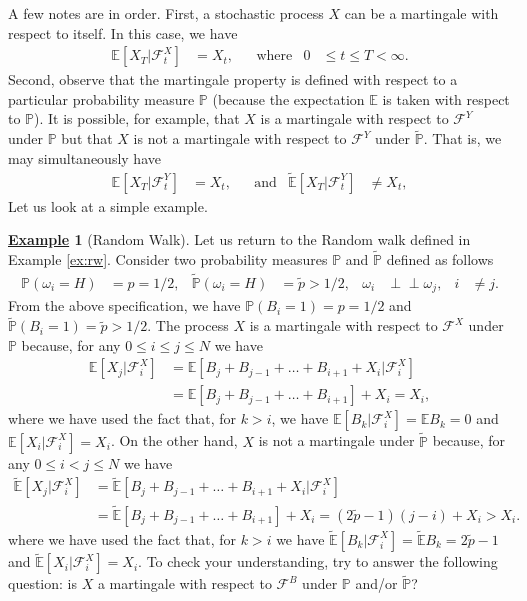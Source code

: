\documentclass[12pt]{book}
\numberwithin{equation}{chapter}
\theoremstyle{plain}
\numberwithin{theorem}{section}
\theoremstyle{definition}
\newtheorem{example}[theorem]{\underline{Example}}
\numberwithin{exercise}{chapter}
\newcommand{\<}{\langle}
\renewcommand{\>}{\rangle}
\renewcommand{\(}{\left(}
\renewcommand{\)}{\right)}
\renewcommand{\[}{\left[}
\renewcommand{\]}{\right]}
\newcommand\Eb{\mathds{E}}
\newcommand\Pb{\mathds{P}}
\newcommand\Fc{\mathscr{F}}
\newcommand\om{\omega}
\newcommand\Ebt{\widetilde{\Eb}}
\newcommand\Pbt{\widetilde{\Pb}}
\newcommand{\ind}{\perp \! \! \! \perp}
\theoremstyle{definition}
\numberwithin{question}{section}
\newcommand\pt{\widetilde{p}}
\begin{document}
\noindent
A few notes are in order.  First, a stochastic process $X$ can be a martingale with respect to itself.  In this case, we have
\begin{align}
\Eb[ X_T | \Fc_t^X ]
	&=	X_t , &
	&\text{where}&
0
	&\leq t \leq T < \infty .
\end{align}
Second, observe that the martingale property is defined with respect to a particular probability measure $\Pb$ (because the expectation $\Eb$ is taken with respect to $\Pb$).  It is possible, for example, that $X$ is a martingale with respect to $\Fc^Y$ under $\Pb$ but that $X$ is not a martingale with respect to $\Fc^Y$ under $\Pbt$.  That is, we may simultaneously have
\begin{align}
\Eb[ X_T | \Fc_t^Y ]
	&=	X_t , &
	&\text{and}&
\Ebt[ X_T | \Fc_t^Y ]
	&\neq	X_t ,
\end{align}
Let us look at a simple example.

\begin{example}[Random Walk]
Let us return to the Random walk defined in Example \ref{ex:rw}.
Consider two probability measures $\Pb$ and $\Pbt$ defined as follows
\begin{align}
\Pb(\om_i = H)
	&=	p = 1/2 , &
\Pbt( \om_i = H)
	&=	\pt > 1/2 , &
\om_i
	&\ind \om_j , &
i
	&\neq j .
\end{align}
From the above specification, we have $\Pb( B_i = 1 ) = p = 1/2$ and $\Pbt( B_i = 1 ) = \pt > 1/2$.
The process $X$ is a martingale with respect to $\Fc^X$ under $\Pb$ because, for any $0 \leq i \leq j \leq N$ we have
\begin{align}
\Eb[ X_j | \Fc_i^X ]
	&=	\Eb[ B_j + B_{j-1} + \ldots + B_{i+1} + X_i | \Fc_i^X ] \\
	&=		\Eb[ B_j + B_{j-1} + \ldots + B_{i+1} ] + X_i 
	=		 X_i  ,
\end{align}
where we have used the fact that, for $k>i$, we have $\Eb[ B_k | \Fc_i^X ] = \Eb B_k = 0$ and $\Eb[ X_i | \Fc_i^X ] = X_i$.
On the other hand, $X$ is not a martingale under $\Pbt$ because, for any $0 \leq i < j \leq N$ we have
\begin{align}
\Ebt[ X_j | \Fc_i^X ]
	&=	\Ebt[ B_j + B_{j-1} + \ldots + B_{i+1} + X_i | \Fc_i^X ] \\
	&=		\Ebt[ B_j + B_{j-1} + \ldots + B_{i+1} ] + X_i 
	=		(2 \pt - 1 ) (j - i) + X_i 
	>		X_i .
\end{align}
where we have used the fact that, for $k > i$ we have $\Ebt[ B_k | \Fc_i^X ] = \Ebt B_k = 2\pt-1$ and $\Ebt[ X_i | \Fc_i^X ] = X_i$.
To check your understanding, try to answer the following question: is $X$ a martingale with respect to $\Fc^B$ under $\Pb$ and/or $\Pbt$?
\end{example}
\end{document}
